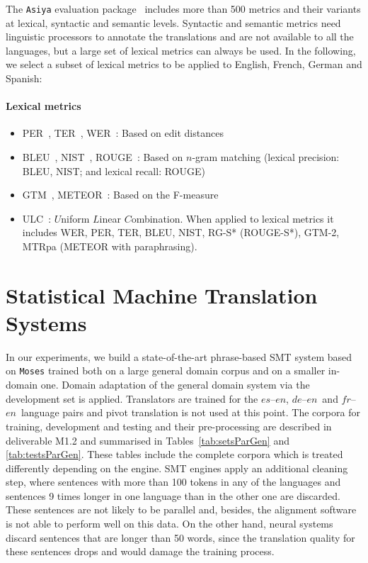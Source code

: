\documentclass[a4paper,11pt]{article}
\newcommand{\en}{$en$}
\newcommand{\es}{$es$}
\newcommand{\fr}{$fr$}
\newcommand{\de}{$de$}
\begin{document}
The {\tt Asiya} evaluation package~\cite{PBML_Asiya:2010, Gonzalez:2012} includes more than 500 metrics and their variants at lexical, syntactic and semantic levels. Syntactic and semantic metrics need linguistic processors to annotate the translations and are not available to all the languages, but a large set of lexical metrics can always be used. In the following, we select a subset of lexical metrics to be applied to English, French, German and Spanish:

\paragraph{Lexical metrics} 
\begin{itemize}
 \item PER~\cite{PER}, TER~\cite{TER}, WER~\cite{WER}: Based on edit distances
 \item BLEU~\cite{papineni2002}, NIST~\cite{NISTmetric}, ROUGE~\cite{ROUGE}: Based on $n$-gram matching (lexical precision: BLEU, NIST; and lexical recall: ROUGE)
 \item GTM~\cite{GTM}, METEOR~\cite{METEOR}: Based on the F-measure
 \item ULC~\cite{ULC}: $U$niform $L$inear $C$ombination. When applied to lexical metrics it includes WER, PER, TER, BLEU, NIST, 
 RG-S* (ROUGE-S*), GTM-2, MTRpa (METEOR with paraphrasing). 
\end{itemize}


\section{Statistical Machine Translation Systems}
\label{s:smt}

In our experiments, we build a state-of-the-art phrase-based SMT system based on {\tt Moses} \cite{moses:2007} trained both on a large general domain corpus and on a smaller in-domain one. Domain adaptation of the general domain system via the development set is applied. Translators are trained for the \es--\en, \de--\en\ and \fr--\en\ language pairs and pivot translation is not used at this point. 
The corpora for training, development and testing and their pre-processing are described in deliverable M1.2 and summarised in Tables~\ref{tab:setsParGen} and \ref{tab:testsParGen}. These tables include the complete corpora which is treated differently depending on the engine. SMT engines apply an additional cleaning step, where sentences with more than 100 tokens in any of the languages and sentences 9 times longer in one language than in the other one are discarded. These sentences are not likely to be parallel and, besides, the alignment software is not able to perform well on this data. 
On the other hand, neural systems discard sentences that are longer than 50 words, since the translation quality for these sentences drops and would damage the training process.
\end{document}
